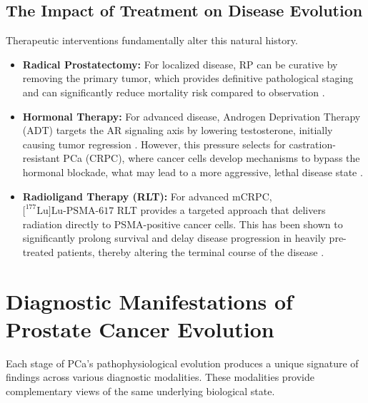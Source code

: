 \documentclass[11pt, a4paper]{article}
\begin{document}
\subsection{The Impact of Treatment on Disease Evolution}
Therapeutic interventions fundamentally alter this natural history.
\begin{itemize}
    \item \textbf{Radical Prostatectomy:} For localized disease, RP can be curative by removing the primary tumor, which provides definitive pathological staging and can significantly reduce mortality risk compared to observation \cite{LuoYi2019, HerlemannCowan2024, LeyhBannurahDellOglio2019}.
    \item \textbf{Hormonal Therapy:} For advanced disease, Androgen Deprivation Therapy (ADT) targets the AR signaling axis by lowering testosterone, initially causing tumor regression \cite{MartinCaraballo2024, UnknownAuthor2014, BellmuntKheoh2016}. However, this pressure selects for castration-resistant PCa (CRPC), where cancer cells develop mechanisms to bypass the hormonal blockade, what may lead to a more aggressive, lethal disease state \cite{MartinCaraballo2024, UnknownAuthor2014}.
    \item \textbf{Radioligand Therapy (RLT):} For advanced mCRPC, $\text{[}^{177}\text{Lu]}\text{Lu-PSMA-617}$ RLT provides a targeted approach that delivers radiation directly to PSMA-positive cancer cells. This has been shown to significantly prolong survival and delay disease progression in heavily pre-treated patients, thereby altering the terminal course of the disease \cite{FizaziHerrmann2023, Keam2022}.
\end{itemize}

\section{Diagnostic Manifestations of Prostate Cancer Evolution}
Each stage of PCa's pathophysiological evolution produces a unique signature of findings across various diagnostic modalities. These modalities provide complementary views of the same underlying biological state.
\end{document}
